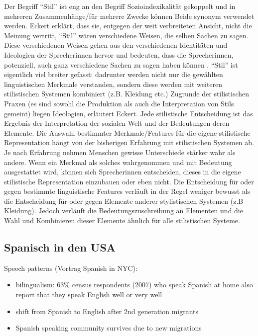 Der Begriff ``Stil'' ist eng an den Begriff Sozioindexikalität gekoppelt und in mehreren Zusammenhänge/für mehrere Zwecke können Beide synonym verwendet werden.
Eckert erklärt, dass sie, entgegen der weit verbreiteten Ansicht, nicht die Meinung vertritt, ``Stil'' wären verschiedene Weisen, die selben Sachen zu sagen.
Diese verschiedenen Weisen gehen aus den verschiedenen Identitäten und Ideologien der Sprecherinnen hervor und bedeuten, dass die Sprecherinnen, potenziell, auch ganz verschiedene Sachen zu sagen haben können \cite[vgl.][]{Eckert08}.
``Stil'' ist eigentlich viel breiter gefasst: dadrunter werden nicht nur die gewählten linguistischen Merkmale verstanden, sondern diese werden mit weiteren stilistischen Systemen kombiniert (z.B. Kleidung etc.)
Zugrunde der stilistischen Praxen (es sind sowohl die Produktion als auch die Interpretation von Stils gemeint) liegen Ideologien, erläutert Eckert.
Jede stilistische Entscheidung ist das Ergebnis der Interpretation der sozialen Welt und der Bedeutungen deren Elemente\cite[vgl.][]{Eckert08}.
Die Auswahl bestimmter Merkmale/Features für die eigene stilistische Representation hängt von der bisherigen Erfahrung mit stilistischen Systemen ab.
Je nach Erfahrung nehmen Menschen gewisse Unterschiede stärker wahr als andere.
Wenn ein Merkmal als solches wahrgenommen und mit Bedeutung ausgestattet wird, können sich Sprecherinnen entscheiden, dieses in die eigene stilistische Representation einzubauen oder eben nicht.
Die Entscheidung für oder gegen bestimmte linguistische Features verläuft in der Regel weniger bewusst als die Entscheidung für oder gegen Elemente anderer stylistischen Systemen (z.B Kleidung).
Jedoch verläuft die Bedeutungszuschreibung an Elementen und die Wahl und Kombinieren dieser Elemente ähnlich für alle stilistischen Systeme.

\subsection{Spanisch in den USA}

Speech patterns (Vortrag Spanish in NYC):
\begin{itemize}
  \item bilingualism: 63\% census respondents (2007) who speak Spanish at home also report that they speak English well or very well
  \item shift from Spanish to English after 2nd generation migrants
  \item Spanish speaking community survives due to new migrations
\end{itemize}


